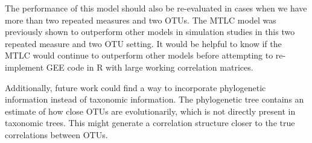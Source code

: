 \documentclass[12pt]{article}
\begin{document}

The performance of this model should also be re-evaluated in cases when we have more than two repeated measures and two OTUs. The MTLC model was previously shown to outperform other models in simulation studies in this two repeated measure and two OTU setting. It would be helpful to know if the MTLC would continue to outperform other models before attempting to re-implement GEE code in R with large working correlation matrices.

Additionally, future work could find a way to incorporate phylogenetic information instead of taxonomic information. The phylogenetic tree contains an estimate of how close OTUs are evolutionarily, which is not directly present in taxonomic trees. This might generate a correlation structure closer to the true correlations between OTUs.











\begin{singlespace}
\printbibliography
\end{singlespace}
\end{document}
